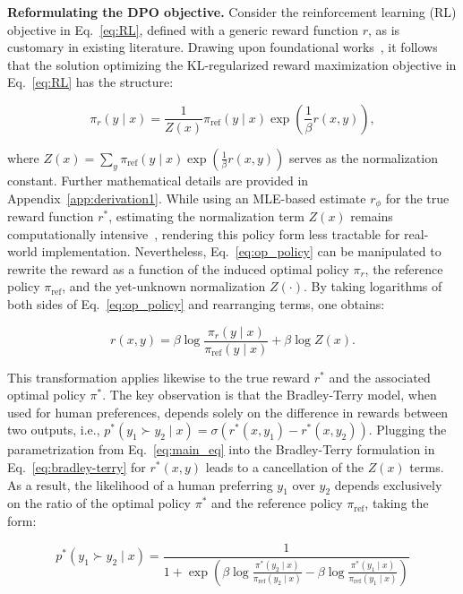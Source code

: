 \textbf{Reformulating the DPO objective.} Consider the reinforcement learning (RL) objective in Eq.~\ref{eq:RL}, defined with a generic reward function $r$, as is customary in existing literature. Drawing upon foundational works~\citep{peters2007reinforcement, peng2019advantage, korbak2022reinforcement, go2023aligning}, it follows that the solution optimizing the KL-regularized reward maximization objective in Eq.~\ref{eq:RL} has the structure:

\begin{equation}\label{eq:op_policy}
    \pi_r(y\mid x) = \frac{1}{Z(x)}\pi_\text{ref}(y\mid x)\exp\left(\frac{1}{\beta}r(x, y)\right),
\end{equation}

where $Z(x) =\sum_{y}\pi_\text{ref}(y\mid x)\exp\left(\frac{1}{\beta}r(x, y)\right)$ serves as the normalization constant. Further mathematical details are provided in Appendix~\ref{app:derivation1}. While using an MLE-based estimate $r_\phi$ for the true reward function $r^*$, estimating the normalization term $Z(x)$ remains computationally intensive~\citep{korbak2022reinforcement, go2023aligning}, rendering this policy form less tractable for real-world implementation. Nevertheless, Eq.~\ref{eq:op_policy} can be manipulated to rewrite the reward as a function of the induced optimal policy $\pi_r$, the reference policy $\pi_\text{ref}$, and the yet-unknown normalization $Z(\cdot)$. By taking logarithms of both sides of Eq.~\ref{eq:op_policy} and rearranging terms, one obtains:

\begin{equation}\label{eq:main_eq}
    r(x,y) =\beta \log \frac{\pi_r(y\mid x)}{\pi_\text{ref}(y\mid x)} + \beta \log Z(x).
\end{equation}

This transformation applies likewise to the true reward $r^*$ and the associated optimal policy $\pi^*$. The key observation is that the Bradley-Terry model, when used for human preferences, depends solely on the difference in rewards between two outputs, i.e., ${p^*(y_1 \succ y_2 \mid x) = \sigma(r^*(x, y_1) - r^*(x, y_2))}$. Plugging the parametrization from Eq.~\ref{eq:main_eq} into the Bradley-Terry formulation in Eq.~\ref{eq:bradley-terry} for $r^*(x, y)$ leads to a cancellation of the $Z(x)$ terms. As a result, the likelihood of a human preferring $y_1$ over $y_2$ depends exclusively on the ratio of the optimal policy $\pi^*$ and the reference policy $\pi_\text{ref}$, taking the form:

\begin{equation}\label{eq:objective}
    p^*(y_1\succ y_2 \mid x)=\frac{1}{1 + \exp\left(\beta \log \frac{\pi^*(y_2\mid x)}{\pi_\text{ref}(y_2\mid x)} - \beta \log \frac{\pi^*(y_1\mid x)}{\pi_\text{ref}(y_1\mid x)}\right)}
\end{equation}

